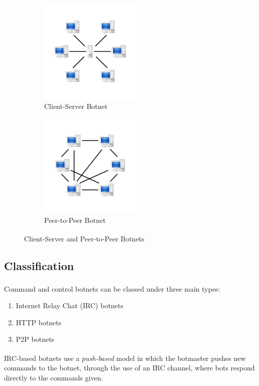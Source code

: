 \begin{figure}[h]
	\begin{subfigure}{0.5\textwidth}
		\includegraphics[width=0.9\linewidth, height=5cm]{img/botnet_client_server.png} 
		\caption{Client-Server Botnet}
	\end{subfigure}
	\begin{subfigure}{0.5\textwidth}
		\includegraphics[width=0.9\linewidth, height=5cm]{img/botnet_p2p.png}
		\caption{Peer-to-Peer Botnet}
	\end{subfigure}
	\caption{Client-Server and Peer-to-Peer Botnets\textsuperscript{\cite{botnetwikipedia}}}
\end{figure}

\subsection{Classification}

Command and control botnets can be classed under three main types\textsuperscript{\cite{fedynyshyn2011detection}}:
\begin{enumerate}
	\item Internet Relay Chat (IRC) botnets
	\item HTTP botnets
	\item P2P botnets
\end{enumerate}

IRC-based botnets\textsuperscript{\cite{dubendorfer2004analysis}} use a \textit{push-based} model in which the botmaster pushes
new commands to the botnet, through the use of an IRC channel, where bots
respond directly to the commands given.

